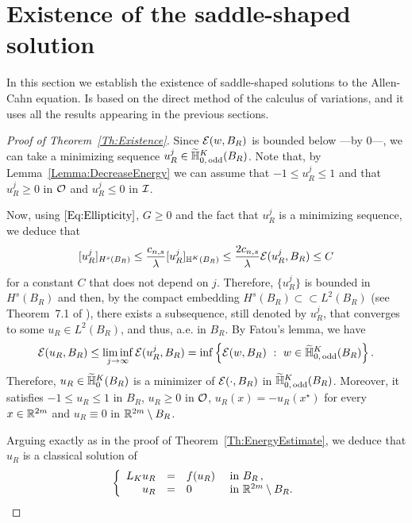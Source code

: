 \section{Existence of the saddle-shaped solution}
\label{Sec:Existence}


In this section we establish the existence of saddle-shaped solutions to the Allen-Cahn equation. Is based on the direct method of the calculus of variations, and it uses all the results appearing in the previous sections.

\begin{proof}[Proof of Theorem~\ref{Th:Existence}]
Since $\mathcal{E}(w,B_R)$ is bounded below ---by $0$---, we can take a minimizing sequence $u_R^j\in \widetilde{\mathbb{H}}^K_{0, \,\mathrm{odd}}(B_R)$. Note that, by Lemma~\ref{Lemma:DecreaseEnergy} we can assume that $-1 \leq u_R^j \leq 1$ and that $u_R^j \geq 0$ in $\mathcal{O}$ and $u_R^j \leq 0$ in $\mathcal{I}$. 

Now, using $\eqref{Eq:Ellipticity}$, $G\geq 0$ and the fact that $u_R^j$ is a minimizing sequence, we deduce that 
$$
[u_R^j]_{H^s(B_R)} \leq \dfrac{c_{n,s}}{\lambda}  [u_R^j]_{\mathbb{H}^K(B_R)}\leq \dfrac{2 c_{n,s}}{\lambda}\mathcal{E}(u_R^j,B_R) \leq C
$$
for a constant $C$ that does not depend on $j$. Therefore, $\{u_R^j\}$ is bounded in $H^s(B_R)$ and then, by the compact embedding $H^s(B_R) \subset \subset L^2(B_R)$ (see Theorem~7.1 of \cite{HitchhikerGuide}), there exists a subsequence, still denoted by $u_R^j$,  that converges to some $u_R \in L^2(B_R)$, and thus, a.e. in $B_R$. By Fatou's lemma, we have
$$
\mathcal{E}(u_R, B_R)
\leq \liminf_{j\to \infty} \mathcal{E}(u_R^j, B_R) = \inf \left \{ \mathcal{E}(w, B_R) \ : \ w \in \widetilde{\mathbb{H}}^K_{0, \,\mathrm{odd}}(B_R) \right \}.
$$
Therefore, $u_R \in \widetilde{\mathbb{H}}^K_0(B_R)$ is a minimizer of $\mathcal{E}(\cdot, B_R)$ in $\widetilde{\mathbb{H}}^K_{0, \,\mathrm{odd}}(B_R)$. Moreover, it satisfies $-1\leq u_R \leq 1$ in $B_R$, $u_R\geq 0$ in $\mathcal{O}$, $u_R(x) = - u_R(x^\star)$ for every $x\in \mathbb{R}^{2m}$ and $u_R \equiv 0 $ in $\mathbb{R}^{2m} \setminus B_R$.

Arguing exactly as in the proof of Theorem~\ref{Th:EnergyEstimate}, we deduce that $u_R$ is a classical solution of
\begin{equation}
\label{Eq:ProofExistenceProblemBR}
	\left\{\begin{array}{rcll}
	L_K  u_R &=& f(u_R) & \textrm{ in } B_R\,,\\
	u_R &=& 0 & \textrm{ in }\mathbb{R}^{2m} \setminus B_R.
	\end{array} \right.
\end{equation}



\end{proof}
